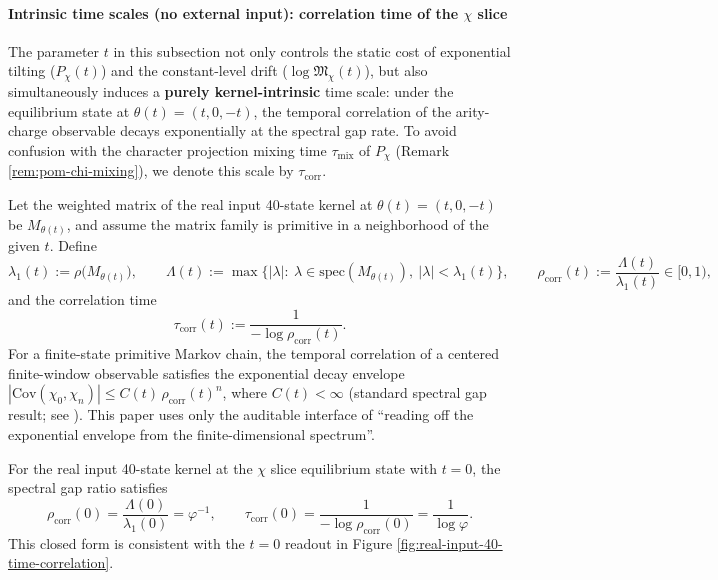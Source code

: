 \paragraph{Intrinsic time scales (no external input): correlation time of the \texorpdfstring{$\chi$}{chi} slice}
The parameter $t$ in this subsection not only controls the static cost of exponential tilting ($P_\chi(t)$) and the constant-level drift ($\log\mathfrak{M}_\chi(t)$), but also simultaneously induces a \textbf{purely kernel-intrinsic} time scale: under the equilibrium state at $\theta(t)=(t,0,-t)$, the temporal correlation of the arity-charge observable decays exponentially at the spectral gap rate.
To avoid confusion with the character projection mixing time $\tau_{\mathrm{mix}}$ of $P_\chi$ (Remark \ref{rem:pom-chi-mixing}), we denote this scale by $\tau_{\mathrm{corr}}$.

\begin{remark}\label{prop:chi-slice-time-correlation}
Let the weighted matrix of the real input 40-state kernel at $\theta(t)=(t,0,-t)$ be $M_{\theta(t)}$, and assume the matrix family is primitive in a neighborhood of the given $t$.
Define
\[
\lambda_1(t):=\rho\bigl(M_{\theta(t)}\bigr),
\qquad
\Lambda(t):=\max\{ |\lambda|:\ \lambda\in\mathrm{spec}(M_{\theta(t)}),\ |\lambda|<\lambda_1(t)\},
\qquad
\rho_{\mathrm{corr}}(t):=\frac{\Lambda(t)}{\lambda_1(t)}\in[0,1),
\]
and the correlation time
\[
\tau_{\mathrm{corr}}(t):=\frac{1}{-\log \rho_{\mathrm{corr}}(t)}.
\]
For a finite-state primitive Markov chain, the temporal correlation of a centered finite-window observable satisfies the exponential decay envelope
\(
|\mathrm{Cov}(\chi_0,\chi_n)|\le C(t)\,\rho_{\mathrm{corr}}(t)^n
\), where $C(t)<\infty$ (standard spectral gap result; see \cite{LevinPeresWilmer2009MarkovMixing}).
This paper uses only the auditable interface of ``reading off the exponential envelope from the finite-dimensional spectrum''.
\end{remark}



\begin{remark}\label{cor:chi-slice-t0-golden-tau}
For the real input 40-state kernel at the $\chi$ slice equilibrium state with $t=0$, the spectral gap ratio satisfies
\[
\rho_{\mathrm{corr}}(0)=\frac{\Lambda(0)}{\lambda_1(0)}=\varphi^{-1},
\qquad
\tau_{\mathrm{corr}}(0)=\frac{1}{-\log\rho_{\mathrm{corr}}(0)}=\frac{1}{\log\varphi}.
\]
This closed form is consistent with the $t=0$ readout in Figure \ref{fig:real-input-40-time-correlation}.
\end{remark}

